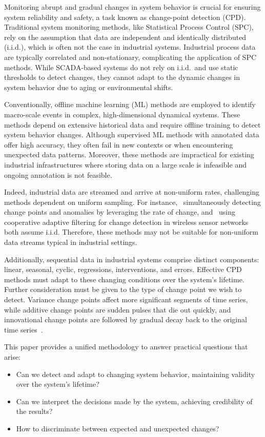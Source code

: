 Monitoring abrupt and gradual changes in system behavior is crucial for ensuring system reliability and safety, a task known as change-point detection (CPD). Traditional system monitoring methods, like Statistical Process Control (SPC), rely on the assumption that data are independent and identically distributed (i.i.d.), which is often not the case in industrial systems. Industrial process data are typically correlated and non-stationary, complicating the application of SPC methods. While SCADA-based systems do not rely on i.i.d.\ and use static thresholds to detect changes, they cannot adapt to the dynamic changes in system behavior due to aging or environmental shifts.

Conventionally, offline machine learning (ML) methods are employed to identify macro-scale events in complex, high-dimensional dynamical systems. These methods depend on extensive historical data and require offline training to detect system behavior changes. Although supervised ML methods with annotated data offer high accuracy, they often fail in new contexts or when encountering unexpected data patterns. Moreover, these methods are impractical for existing industrial infrastructures where storing data on a large scale is infeasible  and ongoing annotation is not feasible.

Indeed, industrial data are streamed and arrive at non-uniform rates, challenging methods dependent on uniform sampling. For instance,~\cite{Liu2023} simultaneously detecting change points and anomalies by leveraging the rate of change, and~\cite{Fathy2019} using cooperative adaptive filtering for change detection in wireless sensor networks both assume i.i.d. Therefore, these methods may not be suitable for non-uniform data streams typical in industrial settings.

Additionally, sequential data in industrial systems comprise distinct components: linear, seasonal, cyclic, regressions, interventions, and errors. Effective CPD methods must adapt to these changing conditions over the system's lifetime. Further consideration must be given to the type of change point we wish to detect. Variance change points affect more significant segments of time series, while additive change points are sudden pulses that die out quickly, and innovational change points are followed by gradual decay back to the original time series~\cite{Srivastava2017}.

This paper provides a unified methodology to answer practical questions that arise:
\begin{itemize}
	\item Can we detect and adapt to changing system behavior, maintaining validity over the system's lifetime?
	\item Can we interpret the decisions made by the system, achieving credibility of the results?
	\item How to discriminate between expected and unexpected changes?
\end{itemize}

